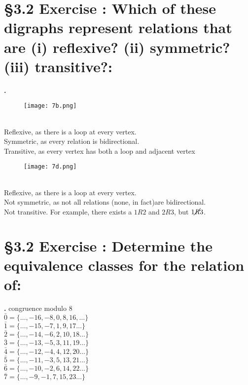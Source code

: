 \documentclass[a4paper,11pt]{article}
\begin{document}
\section*{\S 3.2 Exercise : Which of these digraphs represent relations that are (i) reflexive? (ii) symmetric?
(iii) transitive?:}
\setcounter{SubsectionCounter}{2}
\textbf{.}
\begin{figure}[htbp!]
\centering
\texttt{[image: 7b.png]}
\label{fig:7b}
\end{figure}\\
Reflexive, as there is a loop at every vertex.\\
Symmetric, as every relation is bidirectional.\\
Transitive, as every vertex has both a loop and adjacent vertex\\
\begin{figure}[htbp!]
\centering
\texttt{[image: 7d.png]}
\label{fig:7d}
\end{figure}\\
Reflexive, as there is a loop at every vertex.\\
Not symmetric, as not all relations (none, in fact)are bidirectional.\\
Not transitive. For example, there exists a \(1 R 2\) and \(2 R 3\), but \(1 \cancel{R} 
3\).
\newpage
\setcounter{ProblemCounter}{8}
\section*{\S 3.2 Exercise : Determine the equivalence classes for the relation of:}
\setcounter{SubsectionCounter}{2}
\textbf{.}
congruence modulo 8\\
\noindent \(\bar{0} = \{\ldots, -16, -8, 0, 8, 16, \ldots\}\)\\
\(\bar{1} = \{\ldots, -15, -7, 1, 9, 17 \ldots\}\)\\
\(\bar{2} = \{\ldots, -14, -6, 2, 10, 18 \ldots\}\)\\
\(\bar{3} = \{\ldots, -13, -5, 3, 11, 19 \ldots\}\)\\
\(\bar{4} = \{\ldots, -12, -4, 4, 12, 20 \ldots\}\)\\
\(\bar{5} = \{\ldots, -11, -3, 5, 13, 21 \ldots\}\)\\
\(\bar{6} = \{\ldots, -10, -2, 6, 14, 22 \ldots\}\)\\
\(\bar{7} = \{\ldots, -9, -1, 7, 15, 23 \ldots\}\)
\newpage
\setcounter{ProblemCounter}{10}
\end{document}

